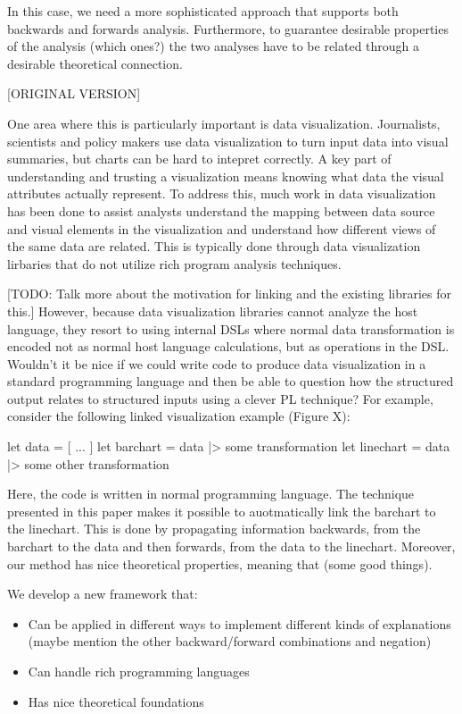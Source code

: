 In this case, we need a more sophisticated approach that supports both backwards and forwards analysis. Furthermore, to guarantee desirable properties of the analysis (which ones?) the two analyses have to be related through a desirable theoretical connection.

[ORIGINAL VERSION]

One area where this is particularly important is data visualization. Journalists, scientists and policy makers use data visualization to turn input data into visual summaries, but charts can be hard to intepret correctly. A key part of understanding and trusting a visualization means knowing what data the visual attributes actually represent. To address this, much work in data visualization has been done to assist analysts understand the mapping between data source and visual elements in the visualization and understand how different views of the same data are related. This is typically done through data visualization lirbaries that do not utilize rich program analysis techniques.

[TODO: Talk more about the motivation for linking and the existing libraries for this.]
However, because data visualization libraries cannot analyze the host language, they resort to using internal DSLs where normal data transformation is encoded not as normal host language calculations, but as operations in the DSL. Wouldn't it be nice if we could write code to produce data visualization in a standard programming language and then be able to question how the structured output relates to structured inputs using a clever PL technique? For example, consider the following linked visualization example (Figure X):

let data = [ ... ]
let barchart = data |> some transformation
let linechart = data |> some other transformation

Here, the code is written in normal programming language. The technique presented in this paper makes it possible to auotmatically link the barchart to the linechart. This is done by propagating information backwards, from the barchart to the data and then forwards, from the data to the linechart. Moreover, our method has nice theoretical properties, meaning that (some good things).

We develop a new framework that:

\begin{itemize}
\item Can be applied in different ways to implement different kinds of explanations (maybe mention the other backward/forward combinations and negation)
\item Can handle rich programming languages
\item Has nice theoretical foundations
\end{itemize}




